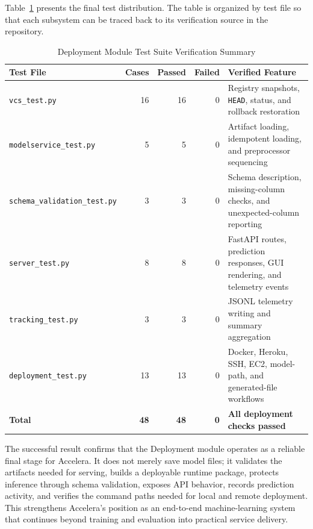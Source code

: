 Table~\ref{tab:deployment-test-summary} presents the final test distribution.
The table is organized by test file so that each subsystem can be traced back
to its verification source in the repository.

\begin{table}[H]
\centering
\acceleraTableStyle
\scriptsize
\caption{Deployment Module Test Suite Verification Summary}
\label{tab:deployment-test-summary}
\begin{tabularx}{\textwidth}{p{}rrrX}
\toprule
\textbf{Test File} & \textbf{Cases} & \textbf{Passed} & \textbf{Failed} & \textbf{Verified Feature} \\
\midrule
\texttt{vcs\_test.py} & 16 & 16 & 0 & Registry snapshots, \texttt{HEAD}, status, and rollback restoration \\
\texttt{modelservice\_test.py} & 5 & 5 & 0 & Artifact loading, idempotent loading, and preprocessor sequencing \\
\texttt{schema\_validation\_test.py} & 3 & 3 & 0 & Schema description, missing-column checks, and unexpected-column reporting \\
\texttt{server\_test.py} & 8 & 8 & 0 & FastAPI routes, prediction responses, GUI rendering, and telemetry events \\
\texttt{tracking\_test.py} & 3 & 3 & 0 & JSONL telemetry writing and summary aggregation \\
\texttt{deployment\_test.py} & 13 & 13 & 0 & Docker, Heroku, SSH, EC2, model-path, and generated-file workflows \\
\midrule
\textbf{Total} & \textbf{48} & \textbf{48} & \textbf{0} & \textbf{All deployment checks passed} \\
\bottomrule
\end{tabularx}
\end{table}

\noindent The successful result confirms that the Deployment module operates as
a reliable final stage for Accelera. It does not merely save model files; it
validates the artifacts needed for serving, builds a deployable runtime
package, protects inference through schema validation, exposes API behavior,
records prediction activity, and verifies the command paths needed for local
and remote deployment. This strengthens Accelera's position as an end-to-end
machine-learning system that continues beyond training and evaluation into
practical service delivery.

